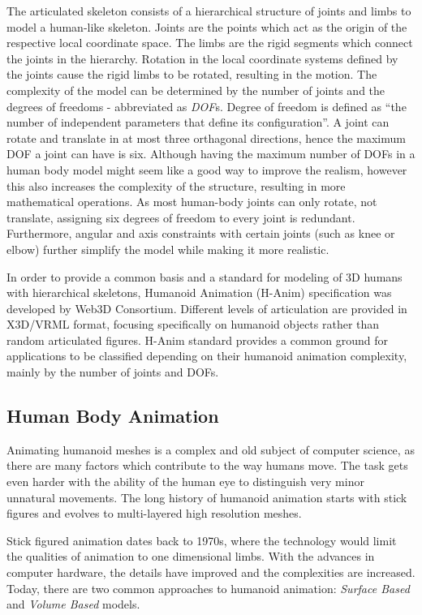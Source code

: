 The articulated skeleton consists of a hierarchical structure of joints and limbs to model a human-like skeleton. Joints are the points which act as the origin of the respective 
local coordinate space. The limbs are the rigid segments which connect the joints in the hierarchy. Rotation in the local coordinate systems defined by the joints cause the rigid
limbs to be rotated, resulting in the motion. The complexity of the model can be determined by the number of joints and the degrees of freedoms - abbreviated as \textit{DOF}s.
Degree of freedom is defined as ``the number of independent parameters that define its configuration''\cite{Lazard2013}. A joint can rotate and translate in at most three orthagonal
directions, hence the maximum DOF a joint can have is six. Although having the maximum number of DOFs in a human body model might seem like a good way to improve the realism, 
however this also increases the complexity of the structure, resulting in more mathematical operations. As most human-body joints can only rotate, not translate, assigning six 
degrees of freedom to every joint is redundant. Furthermore, angular and axis constraints with certain joints (such as knee or elbow) further simplify the model while making it 
more realistic. 

In order to provide a common basis and a standard for modeling of 3D humans with hierarchical skeletons, Humanoid Animation (H-Anim) specification was developed by 
Web3D Consortium\cite{HANIM}. Different levels of articulation are provided in X3D/VRML format, focusing specifically on humanoid objects rather than random 
articulated figures. H-Anim standard provides a common ground for applications to be classified depending on their humanoid animation complexity, mainly by the 
number of joints and DOFs. 

\subsection{Human Body Animation}
\label{section_related_human_body_animation}

Animating humanoid meshes is a complex and old subject of computer science, as there are many factors which contribute to the way humans move. The task gets 
even harder with the ability of the human eye to distinguish very minor unnatural movements. The long history of humanoid animation starts with stick figures 
and evolves to multi-layered high resolution meshes. 

Stick figured animation dates back to 1970s, where the technology would limit the qualities of animation to one dimensional limbs\cite{Badler1979}.
With the advances in computer hardware, the details have improved and the complexities are increased. Today, there are two common approaches to humanoid 
animation: \textit{Surface Based} and \textit{Volume Based} models.

